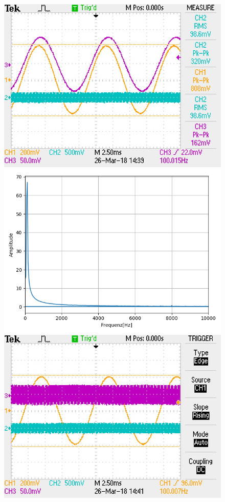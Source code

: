 \documentclass[12pt,a4paper]{article}
\begin{document}
\begin{figure}
\includegraphics[scale=0.9]{Bilder/Vorversuch3/F0004TEK.JPG}
\includegraphics[scale=0.5]{Bilder/Vorversuch3/Vor3_4.png}
\includegraphics[scale=0.9]{Bilder/Vorversuch3/F0005TEK.JPG}

\end{figure}
\end{document}
